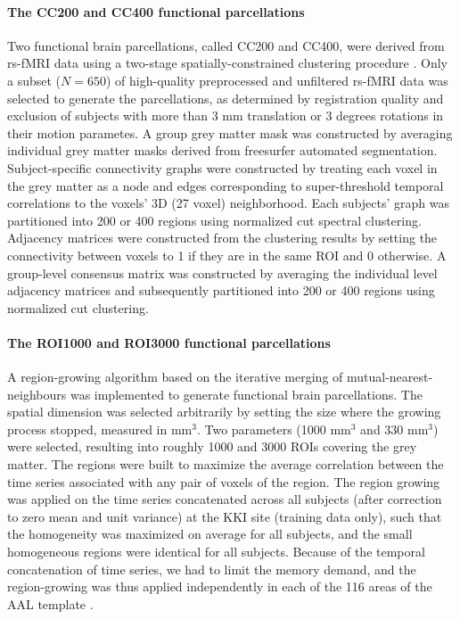 \documentclass[preprint,12pt,3p]{elsarticle}
\begin{document}
\paragraph{The CC200 and CC400 functional parcellations} Two functional brain parcellations, called CC200 and CC400, were derived from rs-fMRI data using a two-stage spatially-constrained clustering procedure \cite{craddock2012whole}. Only a subset ($N=650$) of high-quality preprocessed and unfiltered rs-fMRI data was selected to generate the parcellations, as determined by registration quality and exclusion of subjects with more than 3 mm translation or 3 degrees rotations in their motion parametes. A group grey matter mask was constructed by averaging individual grey matter masks derived from freesurfer automated segmentation. Subject-specific connectivity graphs were constructed by treating each voxel in the grey matter as a node and edges corresponding to super-threshold temporal correlations to the voxels' 3D (27 voxel) neighborhood. Each subjects' graph was partitioned into 200 or 400 regions using normalized cut spectral clustering. Adjacency matrices were constructed from the clustering results by setting the connectivity between voxels to 1 if they are in the same ROI and 0 otherwise. A group-level consensus matrix was constructed by averaging the individual level adjacency matrices and subsequently partitioned into 200 or 400 regions using normalized cut clustering.

\paragraph{The ROI1000 and ROI3000 functional parcellations} A region-growing algorithm \citep{bellec2006identification} based on the iterative merging of mutual-nearest-neighbours was implemented to generate functional brain parcellations. The spatial dimension was selected arbitrarily by setting the size where the growing process stopped, measured in mm$^3$. Two parameters (1000 mm$^3$ and 330 mm$^3$) were selected, resulting into roughly 1000 and 3000 ROIs covering the grey matter. The regions were built to maximize the average correlation between the time series associated with any pair of voxels of the region. The region growing was applied on the time series concatenated across all subjects (after correction to zero mean and unit variance) at the KKI site (training data only), such that the homogeneity was maximized on average for all subjects, and the small homogeneous regions were identical for all subjects. Because of the temporal concatenation of time series, we had to limit the memory demand, and the region-growing was thus applied independently in each of the 116 areas of the AAL template \citep{tzourio2002automated}. 
\end{document}
